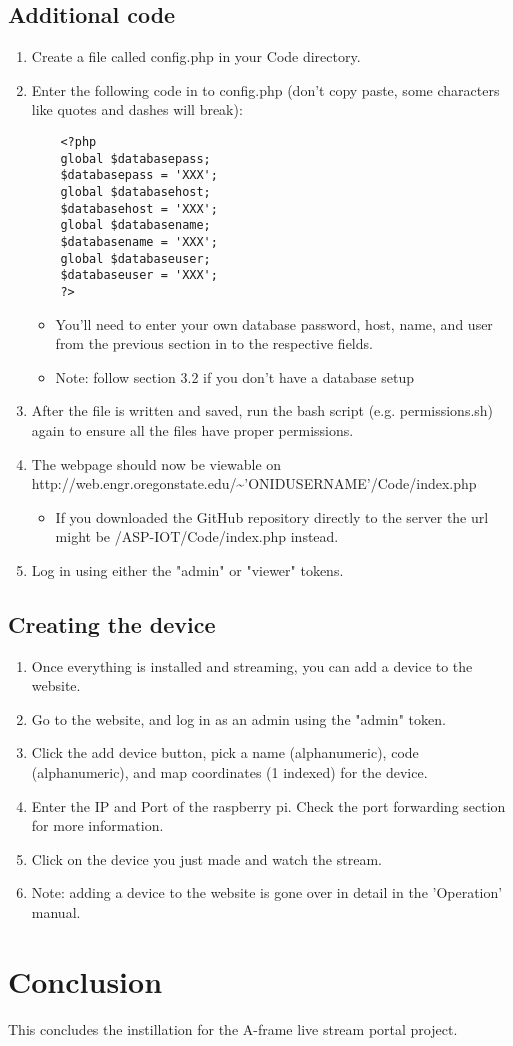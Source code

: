 \documentclass[onecolumn, draftclsnofoot,10pt, compsoc]{IEEEtran}
\begin{document}
\subsection{Additional code}
\begin{enumerate}
    \item Create a file called config.php in your Code directory. 
    \item Enter the following code in to config.php (don't copy paste, some characters like quotes and dashes will break):

    \begin{lstlisting}
    <?php 
    global $databasepass;
    $databasepass = 'XXX'; 
    global $databasehost;
    $databasehost = 'XXX';
    global $databasename;
    $databasename = 'XXX';
    global $databaseuser;
    $databaseuser = 'XXX';
    ?>
    \end{lstlisting}
    \begin{itemize}
        \item You'll need to enter your own database password, host, name, and user from the previous section in to the respective fields.
        \item Note: follow section 3.2 if you don't have a database setup
    \end{itemize}
    \item After the file is written and saved, run the bash script (e.g. permissions.sh) again to ensure all the files have proper permissions. 
    \item The webpage should now be viewable on http://web.engr.oregonstate.edu/\textasciitilde'ONIDUSERNAME'/Code/index.php 
    \begin{itemize}
        \item If you downloaded the GitHub repository directly to the server the url might be /ASP-IOT/Code/index.php instead.
    \end{itemize}
    \item Log in using either the "admin" or "viewer" tokens.
\end{enumerate}
\subsection{Creating the device}
\begin{enumerate}
    \item Once everything is installed and streaming, you can add a device to the website.
    \item  Go to the website, and log in as an admin using the "admin" token.
    \item Click the add device button, pick a name (alphanumeric), code (alphanumeric), and map coordinates (1 indexed) for the device.
    \item Enter the IP and Port of the raspberry pi. Check the port forwarding section for more information.
    \item Click on the device you just made and watch the stream.
    \item Note: adding a device to the website is gone over in detail in the 'Operation' manual. 
\end{enumerate}

\section{Conclusion}
This concludes the instillation for the A-frame live stream portal project.
\end{document}
